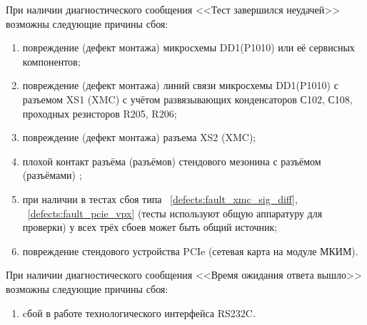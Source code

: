   \begin{sloppypar}
  \label{defects:fault_pcie_xmc}
    \subpoint При наличии диагностического сообщения <<Тест завершился неудачей>> возможны следующие причины сбоя:
      \begin{enumerate}
	\item повреждение (дефект монтажа) микросхемы DD1(P1010) или её сервисных компонентов;
	\item повреждение (дефект монтажа) линий связи микросхемы DD1(P1010) с разъемом XS1 (XMC) с учётом развязывающих конденсаторов С102, С108, проходных резисторов R205, R206;
	\item повреждение (дефект монтажа) разъема XS2 (XMC);
	\item плохой контакт разъёма (разъёмов) стендового мезонина с разъёмом (разъёмами) \DocProductShortTitle;
	\item при наличии в тестах сбоя типа ~\ref{defects:fault_xmc_sig_diff}, ~\ref{defects:fault_pcie_vpx} (тесты используют общую аппаратуру для проверки) у всех трёх сбоев может быть общий источник;
	\item повреждение стендового устройства PCIe (сетевая карта на модуле МКИМ).
      \end{enumerate}
      
    \subpoint При наличии диагностического сообщения <<Время ожидания ответа вышло>> возможны следующие причины сбоя:
      \begin{enumerate}
	\item cбой в работе технологического интерфейса RS232C.
      \end{enumerate}
    
    \end{sloppypar}
      
